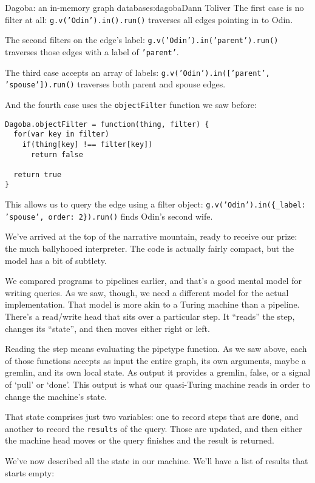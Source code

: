 \begin{aosachapter}{Dagoba: an in-memory graph database}{s:dagoba}{Dann Toliver}
The first case is no filter at all: \texttt{g.v('Odin').in().run()}
traverses all edges pointing in to Odin.

The second filters on the edge's label:
\texttt{g.v('Odin').in('parent').run()} traverses those edges with a
label of \texttt{'parent'}.

The third case accepts an array of labels:
\texttt{g.v('Odin').in({[}'parent', 'spouse'{]}).run()} traverses both
parent and spouse edges.

And the fourth case uses the \texttt{objectFilter} function we saw
before:

\begin{verbatim}
Dagoba.objectFilter = function(thing, filter) {
  for(var key in filter)
    if(thing[key] !== filter[key])
      return false
  
  return true 
}
\end{verbatim}

This allows us to query the edge using a filter object:
\texttt{g.v('Odin').in(\{\_label: 'spouse', order: 2\}).run()} finds
Odin's second wife.

\label{the-interpreters-nature}

We've arrived at the top of the narrative mountain, ready to receive our
prize: the much ballyhooed interpreter. The code is actually fairly
compact, but the model has a bit of subtlety.

We compared programs to pipelines earlier, and that's a good mental
model for writing queries. As we saw, though, we need a different model
for the actual implementation. That model is more akin to a Turing
machine than a pipeline. There's a read/write head that sits over a
particular step. It ``reads'' the step, changes its ``state'', and then
moves either right or left.

Reading the step means evaluating the pipetype function. As we saw
above, each of those functions accepts as input the entire graph, its
own arguments, maybe a gremlin, and its own local state. As output it
provides a gremlin, false, or a signal of `pull' or `done'. This output
is what our quasi-Turing machine reads in order to change the machine's
state.

That state comprises just two variables: one to record steps that are
\texttt{done}, and another to record the \texttt{results} of the query.
Those are updated, and then either the machine head moves or the query
finishes and the result is returned.

We've now described all the state in our machine. We'll have a list of
results that starts empty:


\end{aosachapter}
